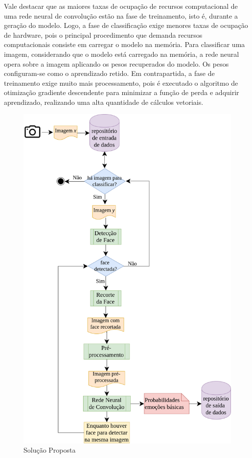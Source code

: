 Vale destacar que as maiores taxas de ocupação de recursos computacional de uma rede neural de convolução estão na fase de treinamento, isto é, durante a geração do modelo. Logo, a fase de classificação exige menores taxas de ocupação de hardware, pois o principal procedimento que demanda recursos computacionais consiste em carregar o modelo na memória. Para classificar uma imagem, considerando que o modelo está carregado na memória, a rede neural opera sobre a imagem aplicando os pesos recuperados do modelo. Os pesos configuram-se como o aprendizado retido. Em contrapartida, a fase de treinamento exige muito mais processamento, pois é executado o algoritmo de otimização gradiente descendente para minimizar a função de perda e adquirir aprendizado, realizando uma alta quantidade de cálculos vetoriais.   


\begin{figure}
\centering
\includegraphics[scale=0.45]{figuras/arquitetura.png}
\caption{Solução Proposta}
\label{fig:arquitetura}
\end{figure}

